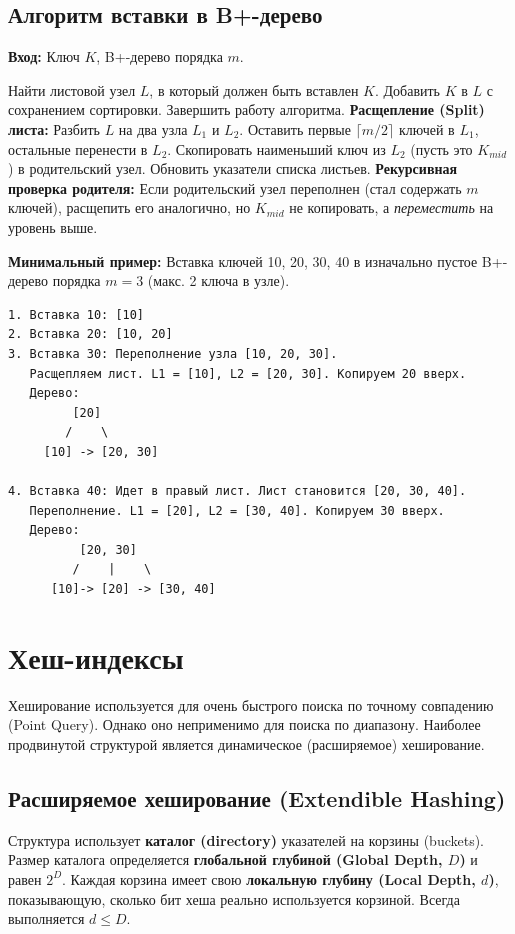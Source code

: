 \documentclass[12pt, a4paper]{article}
\begin{document}
\subsection{Алгоритм вставки в B+-дерево}
\textbf{Вход:} Ключ $K$, B+-дерево порядка $m$.
\begin{algorithmic}[1]
\STATE Найти листовой узел $L$, в который должен быть вставлен $K$.
\STATE Добавить $K$ в $L$ с сохранением сортировки.
    \STATE Завершить работу алгоритма.
\ELSE
    \STATE \textbf{Расщепление (Split) листа:} Разбить $L$ на два узла $L_1$ и $L_2$.
    \STATE Оставить первые $\lceil m/2 \rceil$ ключей в $L_1$, остальные перенести в $L_2$.
    \STATE Скопировать наименьший ключ из $L_2$ (пусть это $K_{mid}$) в родительский узел.
    \STATE Обновить указатели списка листьев.
    \STATE \textbf{Рекурсивная проверка родителя:} Если родительский узел переполнен (стал содержать $m$ ключей), расщепить его аналогично, но $K_{mid}$ не копировать, а \textit{переместить} на уровень выше.
\ENDIF
\end{algorithmic}

\textbf{Минимальный пример:} Вставка ключей 10, 20, 30, 40 в изначально пустое B+-дерево порядка $m=3$ (макс. 2 ключа в узле).

\begin{verbatim}
1. Вставка 10: [10]
2. Вставка 20: [10, 20]
3. Вставка 30: Переполнение узла [10, 20, 30].
   Расщепляем лист. L1 = [10], L2 = [20, 30]. Копируем 20 вверх.
   Дерево:
         [20]
        /    \
     [10] -> [20, 30]

4. Вставка 40: Идет в правый лист. Лист становится [20, 30, 40].
   Переполнение. L1 = [20], L2 = [30, 40]. Копируем 30 вверх.
   Дерево:
          [20, 30]
         /    |    \
      [10]-> [20] -> [30, 40]
\end{verbatim}

\section{Хеш-индексы}

Хеширование используется для очень быстрого поиска по точному совпадению (Point Query). Однако оно неприменимо для поиска по диапазону. Наиболее продвинутой структурой является динамическое (расширяемое) хеширование.

\subsection{Расширяемое хеширование (Extendible Hashing)}
Структура использует \textbf{каталог (directory)} указателей на корзины (buckets). Размер каталога определяется \textbf{глобальной глубиной (Global Depth, $D$)} и равен $2^D$. Каждая корзина имеет свою \textbf{локальную глубину (Local Depth, $d$)}, показывающую, сколько бит хеша реально используется корзиной. Всегда выполняется $d \le D$.
\end{document}
